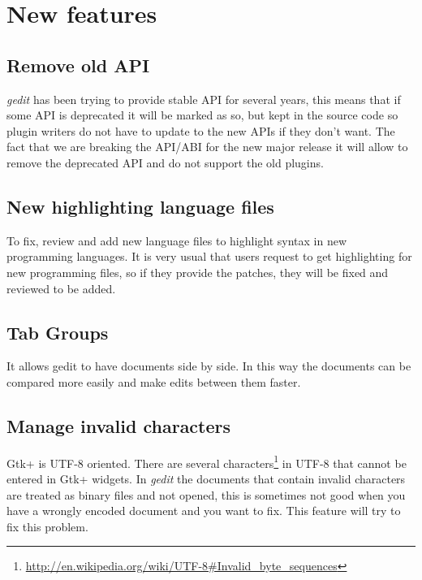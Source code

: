 
\section{New features}\label{sec:NewFeatures}

\subsection{Remove old API}\label{sec:RemoveOldAPI}

\emph{gedit} has been trying to provide stable API for several years, this means that if some API is deprecated it will be marked as so, but kept in the source code so plugin writers do not have to update to the new APIs if they don't want. The fact that we are breaking the API/ABI for the new major release it will allow to remove the deprecated API and do not support the old plugins.

\subsection{New highlighting language files}\label{sec:HighFiles}

To fix, review and add new language files to highlight syntax in new programming languages. It is very usual that users request to get highlighting for new programming files, so if they provide the patches, they will be fixed and reviewed to be added.

\subsection{Tab Groups}\label{sec:TabGroups}

It allows gedit to have documents side by side. In this way the documents can be compared more easily and make edits between them faster.

\subsection{Manage invalid characters}\label{sec:InvalidChars}

Gtk+ is UTF-8 oriented. There are several characters\footnote{\url{http://en.wikipedia.org/wiki/UTF-8\#Invalid_byte_sequences}} in UTF-8 that cannot be entered in Gtk+ widgets. In \emph{gedit} the documents that contain invalid characters are treated as binary files and not opened, this is sometimes not good when you have a wrongly encoded document and you want to fix. This feature will try to fix this problem.

